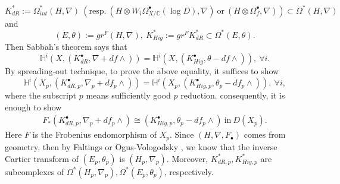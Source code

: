 \documentclass[12pt, a4paper]{article}
\begin{document}
$$K_{dR}^*:=\Omega^*_{int}(H,\nabla)~(\mathrm{resp.}~(H\otimes W_i\Omega^\bullet_{X/\mathbb C}(\log D),\nabla)~\mathrm{or}~(H\otimes\Omega^\bullet_f,\nabla))\subset\Omega^*(H,\nabla)
$$
and 
$$(E,\theta):=gr^F(H,\nabla),~K^*_{Hig}:=gr^FK^*_{dR}\subset\Omega^*(E,\theta).$$
Then Sabbah's theorem says that
$$
\mathbb H^i(X,(K_{dR}^\bullet,\nabla+df\wedge))=\mathbb H^i(X,(K_{Hig}^\bullet,\theta-df\wedge)),~\forall i.
$$
By spreading-out technique, to prove the above equality, it suffices to show
$$
\mathbb H^i(X_p,(K_{dR,p}^\bullet,\nabla_p+df_p\wedge))=\mathbb H^i(X_p,(K_{Hig,p}^\bullet,\theta_p-df_p\wedge)),~\forall i,
$$
where the subscript $p$ means sufficiently good $p$ reduction. consequently, it is enough to show
\begin{eqnarray}\label{Sabbah}
F_*(K_{dR,p}^\bullet,\nabla_p+df_p\wedge)\cong(K_{Hig,p}^\bullet,\theta_p-df_p\wedge)~\mathrm{in}~D(X_p).
\end{eqnarray}
Here $F$ is the Frobenius endomorphism of $X_p$. Since $(H,\nabla,F_\bullet)$ comes from geometry, then by Faltings \cite[Theorem 4.1*]{Fa} or Ogus-Vologodsky \cite[Theorem 4.17]{OV}, we know that the inverse Cartier transform of $(E_p,\theta_p)$ is $(H_p,\nabla_p)$. Moreover, $K^*_{dR,p},K^*_{Hig,p}$ are subcomplexes of $\Omega^*(H_p,\nabla_p),\Omega^*(E_p,\theta_p)$, respectively.
\end{document}
